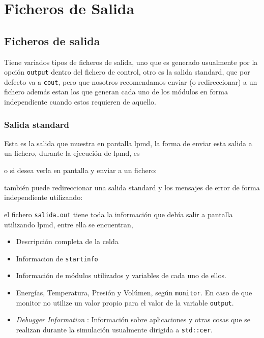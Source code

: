 \section{Ficheros de Salida}

\subsection{Ficheros de salida}
{\lpmd} Tiene variados tipos de ficheros de salida, uno que es generado usualmente por la opci\'on \verb|output| dentro del fichero de control, otro es la salida standard, que por defecto va a \verb|cout|, pero que nosotros recomendamos enviar (o redireccionar) a un fichero adem\'as estan los que generan cada uno de los m\'odulos en forma independiente cuando estos requieren de aquello.

\subsubsection{Salida standard}
Esta es la salida que muestra en pantalla lpmd, la forma de enviar esta salida a un fichero, durante la ejecuci\'on de lpmd, es


o si desea verla en pantalla y enviar a un fichero:


tambi\'en puede redireccionar una salida standard y los mensajes de error de forma independiente utilizando:


el fichero \verb|salida.out| tiene toda la informaci\'on que deb\'ia salir a pantalla utilizando lpmd, entre ella se encuentran,

\begin{itemize}
 \item Descripci\'on completa de la celda
 \item Informacion de \verb|startinfo|
 \item Informaci\'on de m\'odulos utilizados y variables de cada uno de ellos.
 \item Energ\'ias, Temperatura, Presi\'on y Vol\'umen, seg\'un \verb|monitor|. En caso de que monitor no utilize un valor propio para el valor de la variable \verb|output|.
 \item \textit{Debugger Information} : Informaci\'on sobre aplicaciones y otras cosas que se realizan durante la simulaci\'on usualmente dirigida a \verb|std::cer|.
\end{itemize}


